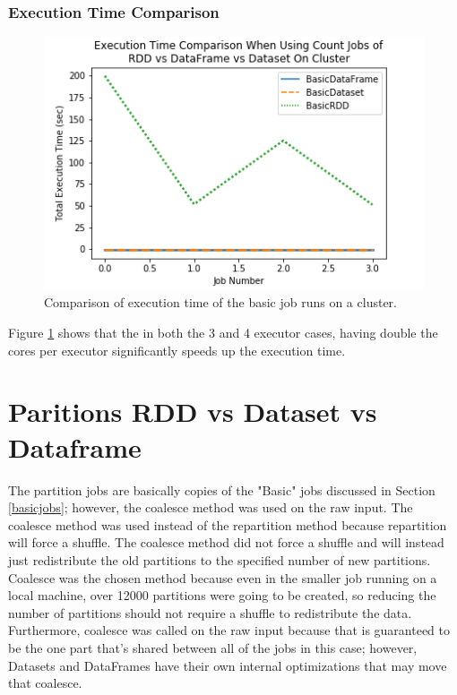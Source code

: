 \documentclass[conference]{IEEEtran}
\begin{document}
\subsubsection{Execution Time Comparison}
\begin{figure}
    \includegraphics[width=\linewidth]{../python_scripts/images/basicJobsAllExecutionTimeCluster.png}
    \caption{Comparison of execution time of the basic job runs on a cluster.}
    \label{fig:basicJobsAllExecutionTimeCluster}
\end{figure}

Figure \ref{fig:basicJobsAllExecutionTimeCluster} shows that the in both the 3 and 4 executor cases, having double the cores per executor significantly speeds up the execution time.

\section{Paritions RDD vs Dataset vs Dataframe}\label{section:partition}
The partition jobs are basically copies of the "Basic" jobs discussed in Section \ref{basicjobs}; however, the coalesce method was used on the raw input.
The coalesce method was used instead of the repartition method because repartition will force a shuffle.
The coalesce method did not force a shuffle and will instead just redistribute the old partitions to the specified number of new partitions.
Coalesce was the chosen method because even in the smaller job running on a local machine, over 12000 partitions were going to be created, so reducing the number of partitions should not require a shuffle to redistribute the data.
Furthermore, coalesce was called on the raw input because that is guaranteed to be the one part that's shared between all of the jobs in this case;
however, Datasets and DataFrames have their own internal optimizations that may move that coalesce.
\end{document}
